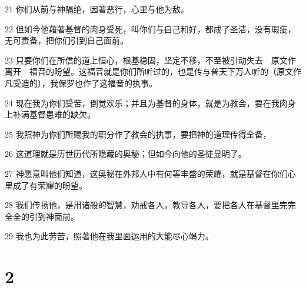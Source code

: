\par 21 你们从前与神隔绝，因著恶行，心里与他为敌。
\par 22 但如今他藉著基督的肉身受死，叫你们与自己和好，都成了圣洁，没有瑕疵，无可责备，把你们引到自己面前。
\par 23 只要你们在所信的道上恒心，根基稳固，坚定不移，不至被引动失去　原文作离开　福音的盼望。这福音就是你们所听过的，也是传与普天下万人听的（原文作凡受造的），我保罗也作了这福音的执事。
\par 24 现在我为你们受苦，倒觉欢乐；并且为基督的身体，就是为教会，要在我肉身上补满基督患难的缺欠。
\par 25 我照神为你们所赐我的职分作了教会的执事，要把神的道理传得全备，
\par 26 这道理就是历世历代所隐藏的奥秘；但如今向他的圣徒显明了。
\par 27 神愿意叫他们知道，这奥秘在外邦人中有何等丰盛的荣耀，就是基督在你们心里成了有荣耀的盼望。
\par 28 我们传扬他，是用诸般的智慧，劝戒各人，教导各人，要把各人在基督里完完全全的引到神面前。
\par 29 我也为此劳苦，照著他在我里面运用的大能尽心竭力。

\chapter{2}

